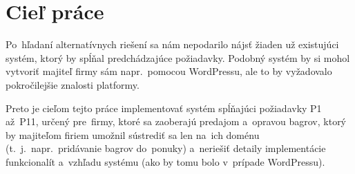 \section{Cieľ práce}

Po~hľadaní alternatívnych riešení sa nám nepodarilo nájsť žiaden už existujúci systém, ktorý by spĺňal predchádzajúce požiadavky. Podobný systém by si mohol vytvoriť majiteľ firmy sám napr.~pomocou WordPressu, ale to by vyžadovalo pokročilejšie znalosti platformy.

Preto je cieľom tejto práce implementovať systém spĺňajúci požiadavky P1 až~P11, určený pre~firmy, ktoré sa zaoberajú predajom a~opravou bagrov, ktorý by majiteľom firiem umožnil sústrediť sa len na~ich doménu (t.~j.~napr.~pridávanie bagrov do~ponuky) a~neriešiť detaily implementácie funkcionalít a~vzhľadu systému (ako by tomu bolo v~prípade WordPressu).
